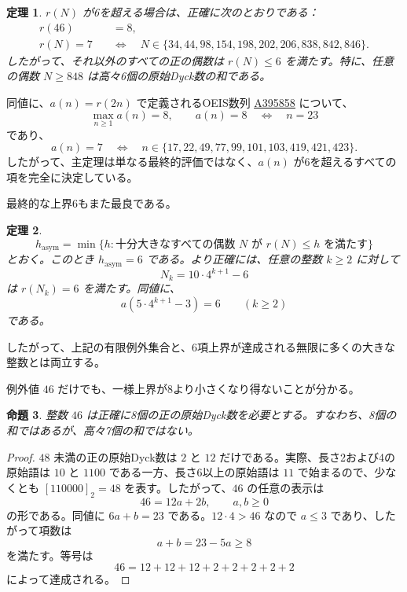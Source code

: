 \documentclass[12pt]{ltjsarticle}
\theoremstyle{plain}
\newtheorem{theorem}{定理}
\newtheorem{proposition}[theorem]{命題}
\theoremstyle{definition}
\theoremstyle{plain}
\newcommand{\seqnum}[1]{\href{https://oeis.org/#1}{\textrm{\underline{#1}}}}
\begin{document}
\begin{theorem}\label{thm:classification}
$r(N)$ が6を超える場合は、正確に次のとおりである：
\[
\begin{aligned}
 r(46)&=8,\\[4pt]
 r(N)=7\quad&\Longleftrightarrow\quad
 N\in\{34,44,98,154,198,202,206,838,842,846\}.
\end{aligned}
\]
したがって、それ以外のすべての正の偶数は $r(N)\leq6$ を満たす。特に、任意の偶数 $N\geq848$ は高々6個の原始Dyck数の和である。
\end{theorem}

同値に、$a(n)=r(2n)$ で定義されるOEIS数列 \seqnum{A395858} \cite{OEIS-A395858} について、
\[
        \max_{n\geq1}a(n)=8,
        \qquad
        a(n)=8\quad\Longleftrightarrow\quad n=23
\]
であり、
\[
 a(n)=7
 \quad\Longleftrightarrow\quad
 n\in\{17,22,49,77,99,101,103,419,421,423\}.
\]
したがって、主定理は単なる最終的評価ではなく、$a(n)$ が6を超えるすべての項を完全に決定している。

最終的な上界6もまた最良である。

\begin{theorem}\label{thm:asymptotic-order}
\[
 h_{\mathrm{asym}}
 =\min\{h:\text{十分大きなすべての偶数 }N\text{ が }r(N)\leq h\text{ を満たす}\}
\]
とおく。このとき $h_{\mathrm{asym}}=6$ である。より正確には、任意の整数 $k\geq2$ に対して
\[
 N_k=10\cdot4^{k+1}-6
\]
は $r(N_k)=6$ を満たす。同値に、
\[
 a(5\cdot4^{k+1}-3)=6\qquad(k\geq2)
\]
である。
\end{theorem}

したがって、上記の有限例外集合と、6項上界が達成される無限に多くの大きな整数とは両立する。

例外値 $46$ だけでも、一様上界が8より小さくなり得ないことが分かる。

\begin{proposition}\label{prop:46}
整数 $46$ は正確に8個の正の原始Dyck数を必要とする。すなわち、8個の和ではあるが、高々7個の和ではない。
\end{proposition}

\begin{proof}
$48$ 未満の正の原始Dyck数は $2$ と $12$ だけである。実際、長さ2および4の原始語は $10$ と $1100$ である一方、長さ6以上の原始語は $11$ で始まるので、少なくとも $[110000]_2=48$ を表す。したがって、$46$ の任意の表示は
\[
        46=12a+2b,\qquad a,b\geq0
\]
の形である。同値に $6a+b=23$ である。$12\cdot4>46$ なので $a\leq3$ であり、したがって項数は
\[
        a+b=23-5a\geq8
\]
を満たす。等号は
\[
        46=12+12+12+2+2+2+2+2
\]
によって達成される。
\end{proof}
\end{document}
